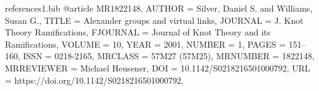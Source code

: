 \documentclass[11pt, reqno]{amsart}
\theoremstyle{definition}
\begin{document}
\begin{filecontents*}[overwrite]{references1.bib}
@article {MR1822148,
    AUTHOR = {Silver, Daniel S. and Williams, Susan G.},
     TITLE = {Alexander groups and virtual links},
   JOURNAL = {J. Knot Theory Ramifications},
  FJOURNAL = {Journal of Knot Theory and its Ramifications},
    VOLUME = {10},
      YEAR = {2001},
    NUMBER = {1},
     PAGES = {151--160},
      ISSN = {0218-2165},
   MRCLASS = {57M27 (57M25)},
  MRNUMBER = {1822148},
MRREVIEWER = {Michael Heusener},
       DOI = {10.1142/S0218216501000792},
       URL = {https://doi.org/10.1142/S0218216501000792},
}
\end{filecontents*}

{}

\end{document}
